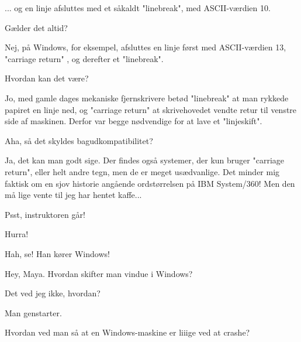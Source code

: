 \documentclass[a4paper,11pt]{article}
\begin{document}
\begin{sketch}


 ... og en linje afsluttes med et såkaldt "linebreak", med ASCII-værdien 10.

 Gælder det altid?

 Nej, på Windows, for eksempel, afsluttes en linje først med ASCII-værdien 13, "carriage return" , og derefter et "linebreak".

 Hvordan kan det være?

 Jo, med gamle dages mekaniske fjernskrivere betød "linebreak" at man rykkede papiret en linje ned, og "carriage return" at skrivehovedet vendte retur til venstre side af maskinen.  Derfor var begge nødvendige for at lave et "linjeskift".

 Aha, så det skyldes bagudkompatibilitet?

 Ja, det kan man godt sige.  Der findes også systemer, der kun bruger "carriage return", eller helt andre tegn, men de er meget usædvanlige. Det minder mig faktisk om en sjov historie angående ordstørrelsen på IBM System/360! Men den må lige vente til jeg har hentet kaffe...


 Psst, instruktoren går!



 Hurra!


 Hah, se! Han kører Windows!


 Hey, Maya. Hvordan skifter man vindue i Windows?

 Det ved jeg ikke, hvordan?

 Man genstarter.


 Hvordan ved man så at en Windows-maskine er liiige ved at crashe?


\end{sketch}
\end{document}
